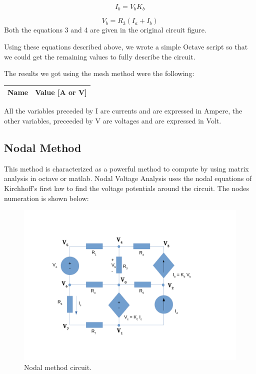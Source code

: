 \begin{equation}
  I_b = V_b K_b
  \label{eq4}
\end{equation}

\begin{equation}
  V_b = R_3 (I_a+I_b)
  \label{eq5}
\end{equation}
Both the equations 3 and 4 are given in the original circuit figure. \par
Using these equations described above, we wrote a simple Octave script so that we could get the remaining values to fully describe the circuit. \par
The results we got using the mesh method were the following: 
\begin{center}
  \begin{tabular}{ | c | c | }
    \hline    
    {\bf Name} & {\bf Value [A or V]} \\ \hline
    \hline
  \end{tabular}
\end{center}
All the variables preceded by I are currents and are expressed in Ampere, the other variables, preceeded by V are voltages and are expressed in Volt.

\subsection{Nodal Method}

This method is characterized as a powerful method to compute by using matrix analysis in octave or matlab. Nodal Voltage Analysis uses the nodal equations of Kirchhoff’s first law to find the voltage potentials around the circuit. The nodes numeration is shown below:

\begin{figure}[H] \centering
\includegraphics[width=0.7\linewidth]{nos.pdf}
\caption{Nodal method circuit.}
\label{fig:nos}
\end{figure}

